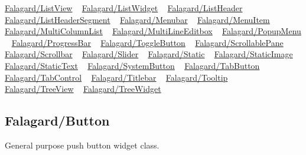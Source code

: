  \mbox{\hyperlink{fal_wr_ref_fal_wr_ref_sec_6}{Falagard/\+List\+View}} ~\newline
 \mbox{\hyperlink{fal_wr_ref_fal_wr_ref_sec_7}{Falagard/\+List\+Widget}} ~\newline
 \mbox{\hyperlink{fal_wr_ref_fal_wr_ref_sec_8}{Falagard/\+List\+Header}} ~\newline
 \mbox{\hyperlink{fal_wr_ref_fal_wr_ref_sec_9}{Falagard/\+List\+Header\+Segment}} ~\newline
 \mbox{\hyperlink{fal_wr_ref_fal_wr_ref_sec_10}{Falagard/\+Menubar}} ~\newline
 \mbox{\hyperlink{fal_wr_ref_fal_wr_ref_sec_11}{Falagard/\+Menu\+Item}} ~\newline
 \mbox{\hyperlink{fal_wr_ref_fal_wr_ref_sec_12}{Falagard/\+Multi\+Column\+List}} ~\newline
 \mbox{\hyperlink{fal_wr_ref_fal_wr_ref_sec_13}{Falagard/\+Multi\+Line\+Editbox}} ~\newline
 \mbox{\hyperlink{fal_wr_ref_fal_wr_ref_sec_14}{Falagard/\+Popup\+Menu}} ~\newline
 \mbox{\hyperlink{fal_wr_ref_fal_wr_ref_sec_15}{Falagard/\+Progress\+Bar}} ~\newline
 \mbox{\hyperlink{fal_wr_ref_fal_wr_ref_sec_16}{Falagard/\+Toggle\+Button}} ~\newline
 \mbox{\hyperlink{fal_wr_ref_fal_wr_ref_sec_17}{Falagard/\+Scrollable\+Pane}} ~\newline
 \mbox{\hyperlink{fal_wr_ref_fal_wr_ref_sec_18}{Falagard/\+Scrollbar}} ~\newline
 \mbox{\hyperlink{fal_wr_ref_fal_wr_ref_sec_19}{Falagard/\+Slider}} ~\newline
 \mbox{\hyperlink{fal_wr_ref_fal_wr_ref_sec_20}{Falagard/\+Static}} ~\newline
 \mbox{\hyperlink{fal_wr_ref_fal_wr_ref_sec_21}{Falagard/\+Static\+Image}} ~\newline
 \mbox{\hyperlink{fal_wr_ref_fal_wr_ref_sec_22}{Falagard/\+Static\+Text}} ~\newline
 \mbox{\hyperlink{fal_wr_ref_fal_wr_ref_sec_23}{Falagard/\+System\+Button}} ~\newline
 \mbox{\hyperlink{fal_wr_ref_fal_wr_ref_sec_24}{Falagard/\+Tab\+Button}} ~\newline
 \mbox{\hyperlink{fal_wr_ref_fal_wr_ref_sec_25}{Falagard/\+Tab\+Control}} ~\newline
 \mbox{\hyperlink{fal_wr_ref_fal_wr_ref_sec_26}{Falagard/\+Titlebar}} ~\newline
 \mbox{\hyperlink{fal_wr_ref_fal_wr_ref_sec_27}{Falagard/\+Tooltip}} ~\newline
 \mbox{\hyperlink{fal_wr_ref_fal_wr_ref_sec_28}{Falagard/\+Tree\+View}} ~\newline
 \mbox{\hyperlink{fal_wr_ref_fal_wr_ref_sec_29}{Falagard/\+Tree\+Widget}} ~\newline
\hypertarget{fal_wr_ref_fal_wr_ref_sec_1}{}\subsection{Falagard/\+Button}\label{fal_wr_ref_fal_wr_ref_sec_1}
General purpose push button widget class.

